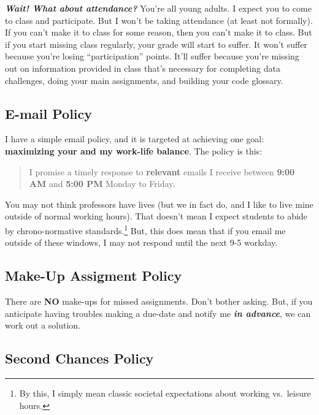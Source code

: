 \documentclass[11pt,]{article}
\begin{document}
\textbf{\emph{Wait! What about attendance?}} You're all young adults. I
expect you to come to class and participate. But I won't be taking
attendance (at least not formally). If you can't make it to class for
some reason, then you can't make it to class. But if you start missing
class regularly, your grade will start to suffer. It won't suffer
because you're losing ``participation'' points. It'll suffer because
you're missing out on information provided in class that's necessary for
completing data challenges, doing your main assignments, and building
your code glossary.

\hypertarget{e-mail-policy}{%
\subsection{E-mail Policy}\label{e-mail-policy}}

I have a simple email policy, and it is targeted at achieving one goal:
\textbf{maximizing your and my work-life balance}. The policy is this:

\begin{quote}
I promise a timely response to \textbf{relevant} emails I receive
between \textbf{9:00 AM} and \textbf{5:00 PM} Monday to Friday.
\end{quote}

You may not think professors have lives (but we in fact do, and I like
to live mine outside of normal working hours). That doesn't mean I
expect students to abide by chrono-normative standards.\footnote{By
  this, I simply mean classic societal expectations about working
  vs.~leisure hours.} But, this does mean that if you email me outside
of these windows, I may not respond until the next 9-5 workday.

\hypertarget{make-up-assigment-policy}{%
\subsection{Make-Up Assigment Policy}\label{make-up-assigment-policy}}

There are \textbf{NO} make-ups for missed assignments. Don't bother
asking. But, if you anticipate having troubles making a due-date and
notify me \textbf{\emph{in advance}}, we can work out a solution.

\hypertarget{second-chances-policy}{%
\subsection{Second Chances Policy}\label{second-chances-policy}}
\end{document}
